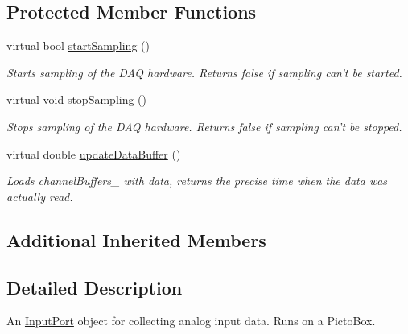 \subsection*{Protected Member Functions}
\begin{DoxyCompactItemize}
\item 
virtual bool \hyperlink{class_picto_1_1_picto_box_x_p_analog_input_port_a65f5611cc96bc00b20ec3a7673a6ba9c}{start\-Sampling} ()
\begin{DoxyCompactList}\small\item\em Starts sampling of the D\-A\-Q hardware. Returns false if sampling can't be started. \end{DoxyCompactList}\item 
\hypertarget{class_picto_1_1_picto_box_x_p_analog_input_port_aba8e0d443fb508ed6f3e6aed4adad7f8}{virtual void \hyperlink{class_picto_1_1_picto_box_x_p_analog_input_port_aba8e0d443fb508ed6f3e6aed4adad7f8}{stop\-Sampling} ()}\label{class_picto_1_1_picto_box_x_p_analog_input_port_aba8e0d443fb508ed6f3e6aed4adad7f8}

\begin{DoxyCompactList}\small\item\em Stops sampling of the D\-A\-Q hardware. Returns false if sampling can't be stopped. \end{DoxyCompactList}\item 
virtual double \hyperlink{class_picto_1_1_picto_box_x_p_analog_input_port_ae4ed62d931606bba385b36c1836274e8}{update\-Data\-Buffer} ()
\begin{DoxyCompactList}\small\item\em Loads channel\-Buffers\-\_\- with data, returns the precise time when the data was actually read. \end{DoxyCompactList}\end{DoxyCompactItemize}
\subsection*{Additional Inherited Members}


\subsection{Detailed Description}
An \hyperlink{class_picto_1_1_input_port}{Input\-Port} object for collecting analog input data. Runs on a Picto\-Box. 


